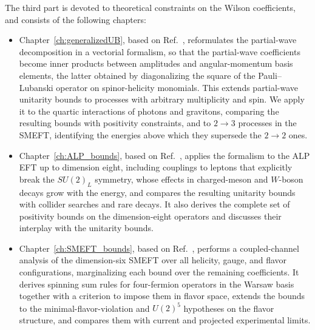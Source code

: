 The third part is devoted to theoretical constraints on the Wilson coefficients, and consists of the
following chapters:
\begin{itemize}
    \item Chapter~\ref{ch:generalizedUB}, based on Ref.~\cite{Bresciani:2025toe}, reformulates the
    partial-wave decomposition in a vectorial formalism, so that the partial-wave coefficients become inner products between
    amplitudes and angular-momentum basis elements, the latter obtained by diagonalizing the square
    of the Pauli--Lubanski operator on spinor-helicity monomials. This extends partial-wave unitarity
    bounds to processes with arbitrary multiplicity and spin. We apply it to the quartic interactions
    of photons and gravitons, comparing the resulting bounds with positivity constraints, and to $2\to3$
    processes in the SMEFT, identifying the energies above which they supersede the $2\to2$ ones.
    \item Chapter~\ref{ch:ALP_bounds}, based on Ref.~\cite{Bresciani:2025ojh}, applies the formalism
    to the ALP EFT up to dimension eight, including couplings to leptons that explicitly break the $SU(2)_L$ symmetry, whose effects in charged-meson and $W$-boson decays grow with the energy, and compares the resulting unitarity bounds with collider searches and rare decays. It also derives the complete set of positivity bounds on the dimension-eight operators and discusses their interplay with the unitarity bounds.
    \item Chapter~\ref{ch:SMEFT_bounds}, based on Ref.~\cite{Bresciani:2026acy}, performs a coupled-channel analysis of the dimension-six SMEFT over all helicity, gauge,
    and flavor configurations, marginalizing each bound over the remaining coefficients. It derives
    spinning sum rules for four-fermion operators in the Warsaw basis together with a criterion to
    impose them in flavor space, extends the bounds to the
    minimal-flavor-violation and
    $U(2)^5$ hypotheses on the flavor structure, and compares them with
    current and projected experimental limits.
\end{itemize}

